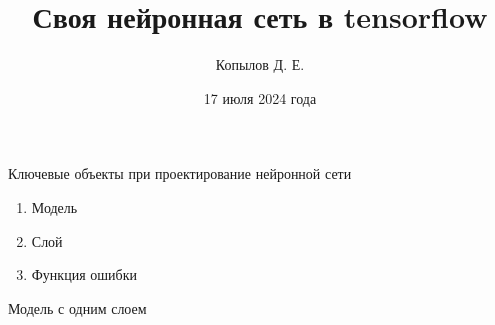 \documentclass[]{beamer}
\title[NN tf]{Своя нейронная сеть в tensorflow}
\author[Копылов Даниил]{Копылов Д. Е.}
\date{17 июля 2024 года}
\begin{document}
\begin{frame}
  \titlepage
\end{frame}

\begin{frame}{Ключевые объекты при проектирование нейронной сети}
	\begin{block}{}
		\begin{enumerate}
			\item Модель
			\item Слой
			\item Функция ошибки
		\end{enumerate}
	\end{block}
\end{frame}
\begin{frame}{Модель с одним слоем}

\end{frame}
\end{document}
